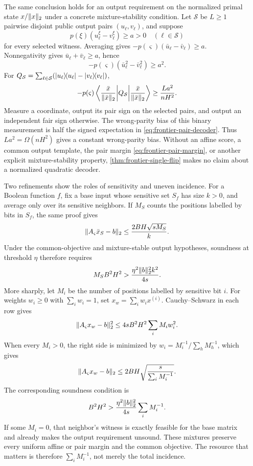 The same conclusion holds for an output requirement on the normalized primal
state \(x/\lVert x\rVert_2\) under a concrete mixture-stability condition.  Let
\(\mathcal S\) be \(L\geq1\) pairwise disjoint public output pairs
\((u_\ell,v_\ell)\), and suppose
\begin{equation}
 p(\xi)(u_\ell^\xi-v_\ell^\xi)\geq a>0
 \quad(\ell\in\mathcal S)
 \label{eq:frontier-pair-margin}
\end{equation}
for every selected witness.  Averaging gives
\(-p(\varsigma)(\bar u_\ell-\bar v_\ell)\geq a\).  Nonnegativity gives
\(\bar u_\ell+\bar v_\ell\geq a\), hence
\[
 -p(\varsigma)(\bar u_\ell^2-\bar v_\ell^2)\geq a^2.
\]
For
\(Q_{\mathcal S}=\sum_{\ell\in\mathcal S}
 (\lvert u_\ell\rangle\!\langle u_\ell\rvert-\lvert v_\ell\rangle\!\langle v_\ell\rvert)\),
\begin{equation}
 -p(\varsigma)
 \left\langle\frac{\bar x}{\lVert\bar x\rVert_2}\middle|
 Q_{\mathcal S}\middle|\frac{\bar x}{\lVert\bar x\rVert_2}\right\rangle
 \geq\frac{La^2}{nH^2}.
 \label{eq:frontier-pair-decoder}
\end{equation}
Measure a coordinate, output its pair sign on the selected pairs, and
output an independent fair sign otherwise.  The wrong-parity bias of this
binary measurement is half the signed expectation in
\eqref{eq:frontier-pair-decoder}.
Thus \(La^2=\Omega(nH^2)\) gives a constant wrong-parity bias.
Without an affine score, a common output template, the pair margin
\eqref{eq:frontier-pair-margin}, or another explicit mixture-stability
property, \cref{thm:frontier-single-flip} makes no claim about a
normalized quadratic decoder.

Two refinements show the roles of sensitivity and uneven incidence.  For a
Boolean function \(f\), fix a base input whose sensitive
set \(S_f\) has size \(k>0\), and average only over its sensitive neighbors.
If \(M_S\) counts the positions labelled by bits in \(S_f\), the same proof
gives
\begin{equation}
 \lVert A_{\varsigma}\bar x_S-b\rVert_2
 \leq\frac{2BH\sqrt{sM_S}}{k}.
 \label{eq:frontier-sensitivity}
\end{equation}
Under the common-objective and mixture-stable output hypotheses, soundness
at threshold \(\eta\) therefore requires
\[
 M_SB^2H^2>
 \frac{\eta^2\lVert b\rVert_2^2k^2}{4s}.
\]
More sharply, let \(M_i\) be the number of positions labelled by sensitive
bit \(i\).  For weights \(w_i\geq0\) with \(\sum_iw_i=1\), set
\(x_w=\sum_iw_ix^{(i)}\).  Cauchy--Schwarz in each row gives
\begin{equation}
 \lVert A_{\varsigma}x_w-b\rVert_2^2
 \leq4sB^2H^2\sum_iM_iw_i^2.
 \label{eq:frontier-weighted-mixture}
\end{equation}
When every \(M_i>0\), the right side is minimized by
\(w_i=M_i^{-1}/\sum_hM_h^{-1}\), which gives
\[
 \lVert A_{\varsigma}x_w-b\rVert_2
 \leq2BH\sqrt{\frac{s}{\sum_iM_i^{-1}}}.
\]
The corresponding soundness condition is
\[
 B^2H^2>
 \frac{\eta^2\lVert b\rVert_2^2}{4s}\sum_iM_i^{-1}.
\]
If some \(M_i=0\), that neighbor's witness is exactly feasible for the base
matrix and already makes the output requirement unsound.  These mixtures preserve
every uniform affine or pair margin and the common objective.  The resource
that matters is therefore \(\sum_iM_i^{-1}\), not merely the total
incidence.

